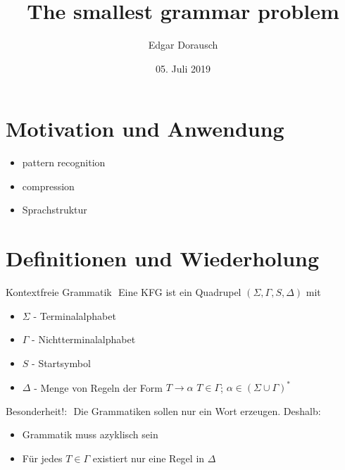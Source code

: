 \documentclass[xcolor=dvipsnames]{beamer}
\title{The smallest grammar problem}
\date{05. Juli 2019}
\author{Edgar Dorausch}
\begin{document}
\maketitle

\newcommand{\Gap}{$ $ \linebreak}


\section{Motivation und Anwendung}

\begin{frame}{\secname}
	\begin{itemize}[<+->]
		\item pattern recognition
		\item compression
		\item Sprachstruktur
	\end{itemize}
\end{frame}

\section{Definitionen und Wiederholung}
\begin{frame}{\secname}
	\begin{block}{Kontextfreie Grammatik}
		\Gap
		Eine KFG ist ein Quadrupel $(\Sigma,\Gamma,S,\Delta)$ mit
		\begin{itemize}
			\item $\Sigma$ - Terminalalphabet
			\item $\Gamma$ - Nichtterminalalphabet
			\item $S$ - Startsymbol
			\item $\Delta$ - Menge von Regeln der Form $T\rightarrow\alpha$\linebreak
			$T \in \Gamma$;
			$\alpha \in (\Sigma \cup \Gamma)^\ast$
		\end{itemize}
	\end{block}
	
\end{frame}

\begin{frame}{\secname}
\begin{alert}{Besonderheit!:}
	\Gap
	Die Grammatiken sollen nur ein Wort erzeugen. Deshalb:
	\begin{itemize}
		
		\item Grammatik muss azyklisch sein
		\item Für jedes $T \in \Gamma$ existiert nur eine Regel in $\Delta$
	\end{itemize}
\end{alert}
\end{frame}
\end{document}
